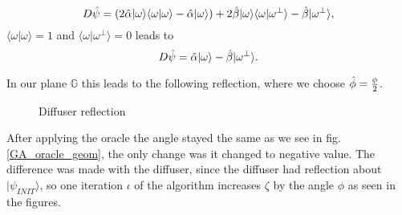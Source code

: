 \begin{equation}
    D\Hat{\psi}=(2\Hat{\alpha}|\omega\rangle\langle\omega|\omega\rangle-\Hat{\alpha}|\omega\rangle) + 2\Hat{\beta}|\omega\rangle\langle\omega|\omega^{\perp}\rangle - \Hat{\beta}|\omega^{\perp}\rangle,
\end{equation}
$\langle\omega|\omega\rangle=1$ and $\langle\omega|\omega^{\perp}\rangle=0$ leads to
\begin{equation}
    D\Hat{\psi}=\Hat{\alpha}|\omega\rangle - \Hat{\beta}|\omega^{\perp}\rangle.
\end{equation}

In our plane $\mathbb{G}$ this leads to the following reflection, where we choose $\Hat{\phi}=\frac{\phi}{2}$.

\begin{figure}[h]
\begin{center}
\caption{Diffuser reflection} \label{GA_diffuser_geom}
\end{center}
\end{figure}
After applying the oracle the angle stayed the same as we see in fig. \ref{GA_oracle_geom}, the only change was it changed to negative value. The difference was made with the diffuser, since the diffuser had reflection about $|\psi_{INIT}\rangle$, so one iteration $\iota$ of the algorithm increases $\zeta$ by the angle $\phi$ as seen in the figures.

